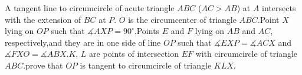 A tangent line to circumcircle of acute triangle $ABC$ ($AC>AB$) at $A$ intersects with the extension of $BC$ at $P$. $O$ is the circumcenter of triangle $ABC$.Point $X$ lying on $OP$ such that $\measuredangle AXP=90^\circ$.Points $E$ and $F$ lying on $AB$ and $AC$, respectively,and they are in one side of line $OP$ such that $ \measuredangle EXP=\measuredangle ACX $  and $\measuredangle FXO=\measuredangle ABX $.$K$, $L$ are points of intersection $EF$ with circumcircle of triangle $ABC$.prove that $OP$ is tangent to circumcircle of triangle $KLX$.